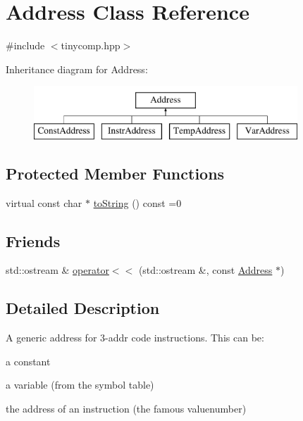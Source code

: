 \hypertarget{class_address}{}\section{Address Class Reference}
\label{class_address}


{\ttfamily \#include $<$tinycomp.\+hpp$>$}

Inheritance diagram for Address\+:\begin{figure}[H]
\begin{center}
\leavevmode
\includegraphics[height=2.000000cm]{class_address}
\end{center}
\end{figure}
\subsection*{Protected Member Functions}
\begin{DoxyCompactItemize}
\item 
virtual const char $\ast$ \hyperlink{class_address_ac58183c3d3dc7c3e98a17825dd086de1}{to\+String} () const =0
\end{DoxyCompactItemize}
\subsection*{Friends}
\begin{DoxyCompactItemize}
\item 
std\+::ostream \& \hyperlink{class_address_a97ca8ad46cb9b316e2ff08e163457ca6}{operator$<$$<$} (std\+::ostream \&, const \hyperlink{class_address}{Address} $\ast$)
\end{DoxyCompactItemize}


\subsection{Detailed Description}
A generic address for 3-\/addr code instructions. This can be\+:
\begin{DoxyItemize}
\item a constant
\item a variable (from the symbol table)
\item the address of an instruction (the famous valuenumber) 
\end{DoxyItemize}

